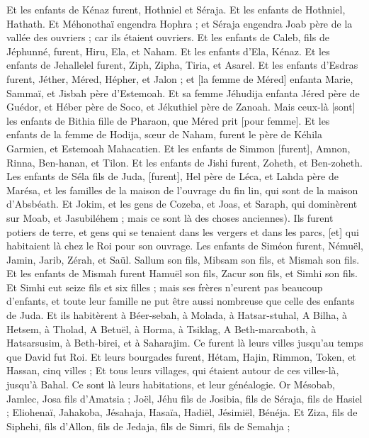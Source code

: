 \begin{multicols}{2}
Et les enfants de Kénaz furent, Hothniel et Séraja. Et les enfants de Hothniel, Hathath.
Et Méhonothaï engendra Hophra ; et Séraja engendra Joab père de la vallée des ouvriers ; car ils étaient ouvriers.
Et les enfants de Caleb, fils de Jéphunné, furent, Hiru, Ela, et Naham. Et les enfants d'Ela, Kénaz.
Et les enfants de Jehallelel furent, Ziph, Zipha, Tiria, et Asarel.
Et les enfants d'Esdras furent, Jéther, Méred, Hépher, et Jalon ; et [la femme de Méred] enfanta Marie, Sammaï, et Jisbah père d'Estemoah.
Et sa femme Jéhudija enfanta Jéred père de Guédor, et Héber père de Soco, et Jékuthiel père de Zanoah. Mais ceux-là [sont] les enfants de Bithia fille de Pharaon, que Méred prit [pour femme].
Et les enfants de la femme de Hodija, sœur de Naham, furent le père de Kéhila Garmien, et Estemoah Mahacatien.
Et les enfants de Simmon [furent], Amnon, Rinna, Ben-hanan, et Tilon. Et les enfants de Jishi furent, Zoheth, et Ben-zoheth.
Les enfants de Séla fils de Juda, [furent], Hel père de Léca, et Lahda père de Marésa, et les familles de la maison de l'ouvrage du fin lin, qui sont de la maison d'Absbéath.
Et Jokim, et les gens de Cozeba, et Joas, et Saraph, qui dominèrent sur Moab, et Jasubiléhem ; mais ce sont là des choses anciennes).
Ils furent potiers de terre, et gens qui se tenaient dans les vergers et dans les parcs, [et] qui habitaient là chez le Roi pour son ouvrage.
Les enfants de Siméon furent, Némuël, Jamin, Jarib, Zérah, et Saül.
Sallum son fils, Mibsam son fils, et Mismah son fils.
Et les enfants de Mismah furent Hamuël son fils, Zacur son fils, et Simhi son fils.
Et Simhi eut seize fils et six filles ; mais ses frères n'eurent pas beaucoup d'enfants, et toute leur famille ne put être aussi nombreuse que celle des enfants de Juda.
Et ils habitèrent à Béer-sebah, à Molada, à Hatsar-stuhal,
A Bilha, à Hetsem, à Tholad,
A Betuël, à Horma, à Tsiklag,
A Beth-marcaboth, à Hatsarsusim, à Beth-birei, et à Saharajim. Ce furent là leurs villes jusqu'au temps que David fut Roi.
Et leurs bourgades furent, Hétam, Hajin, Rimmon, Token, et Hassan, cinq villes ;
Et tous leurs villages, qui étaient autour de ces villes-là, jusqu'à Bahal. Ce sont là leurs habitations, et leur généalogie.
Or Mésobab, Jamlec, Josa fils d'Amatsia ;
Joël, Jéhu fils de Josibia, fils de Séraja, fils de Hasiel ;
Eliohenaï, Jahakoba, Jésahaja, Hasaïa, Hadiël, Jésimiël, Bénéja.
Et Ziza, fils de Siphehi, fils d'Allon, fils de Jedaja, fils de Simri, fils de Semahja ;

\end{multicols}
